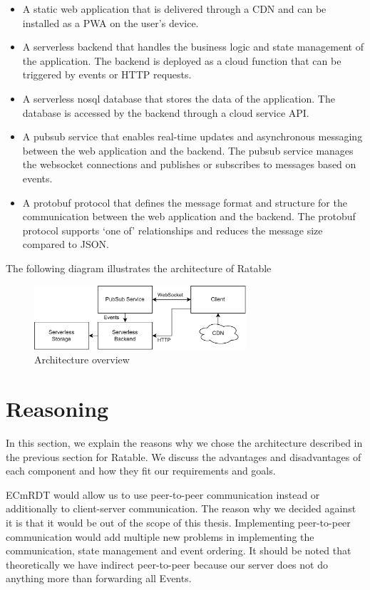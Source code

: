 \documentclass[
	ngerman,
	ruledheaders=section,   %
	class=report,		    %
	thesis={type=bachelor}, %
	accentcolor=9c,			%
	custommargins=true,    %
	marginpar=false,        %
	parskip=half-,          %
	fontsize=11pt,          %
]{tudapub}
\begin{document}
\begin{itemize}
  \item A static web application that is delivered through a CDN and can be installed as a PWA on the user’s device.
  \item A serverless backend that handles the business logic and state management of the application. The backend is deployed as a cloud function that can be triggered by events or HTTP requests.
  \item A serverless nosql database that stores the data of the application. The database is accessed by the backend through a cloud service API.
  \item A pubsub service that enables real-time updates and asynchronous messaging between the web application and the backend. The pubsub service manages the websocket connections and publishes or subscribes to messages based on events.
  \item A protobuf protocol that defines the message format and structure for the communication between the web application and the backend. The protobuf protocol supports ‘one of’ relationships and reduces the message size compared to JSON.
\end{itemize}
The following diagram illustrates the architecture of Ratable

\begin{figure}[h]
  \centering
  \includegraphics[width=0.7\textwidth]{architecture_services.png}
  \caption{Architecture overview}
\end{figure}

\section{Reasoning}
In this section, we explain the reasons why we chose the architecture described in the previous section for Ratable. We discuss the advantages and disadvantages of each component and how they fit our requirements and goals.

ECmRDT would allow us to use peer-to-peer communication instead or additionally to client-server communication. The reason why we decided against it is that it would be out of the scope of this thesis. Implementing peer-to-peer communication would add multiple new problems in implementing the communication, state management and event ordering. It should be noted that theoretically we have indirect peer-to-peer because our server does not do anything more than forwarding all Events.
\end{document}
